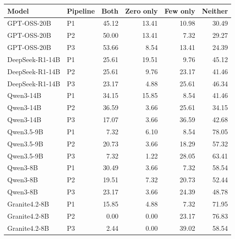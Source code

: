 \begin{tabularx}{\textwidth}{lXrrrr}
\toprule
Model & Pipeline & Both & Zero only & Few only & Neither \\
\midrule
GPT-OSS-20B & P1 & 45.12 & 13.41 & 10.98 & 30.49 \\
GPT-OSS-20B & P2 & 50.00 & 13.41 & 7.32 & 29.27 \\
GPT-OSS-20B & P3 & 53.66 & 8.54 & 13.41 & 24.39 \\
DeepSeek-R1-14B & P1 & 25.61 & 19.51 & 9.76 & 45.12 \\
DeepSeek-R1-14B & P2 & 25.61 & 9.76 & 23.17 & 41.46 \\
DeepSeek-R1-14B & P3 & 23.17 & 4.88 & 25.61 & 46.34 \\
Qwen3-14B & P1 & 34.15 & 15.85 & 8.54 & 41.46 \\
Qwen3-14B & P2 & 36.59 & 3.66 & 25.61 & 34.15 \\
Qwen3-14B & P3 & 17.07 & 3.66 & 36.59 & 42.68 \\
Qwen3.5-9B & P1 & 7.32 & 6.10 & 8.54 & 78.05 \\
Qwen3.5-9B & P2 & 20.73 & 3.66 & 18.29 & 57.32 \\
Qwen3.5-9B & P3 & 7.32 & 1.22 & 28.05 & 63.41 \\
Qwen3-8B & P1 & 30.49 & 3.66 & 7.32 & 58.54 \\
Qwen3-8B & P2 & 19.51 & 7.32 & 20.73 & 52.44 \\
Qwen3-8B & P3 & 23.17 & 3.66 & 24.39 & 48.78 \\
Granite4.2-8B & P1 & 15.85 & 4.88 & 7.32 & 71.95 \\
Granite4.2-8B & P2 & 0.00 & 0.00 & 23.17 & 76.83 \\
Granite4.2-8B & P3 & 2.44 & 0.00 & 39.02 & 58.54 \\
\bottomrule
\end{tabularx}
